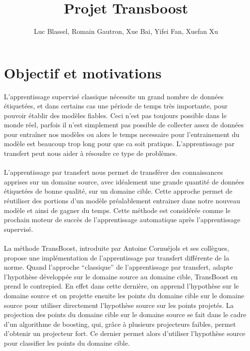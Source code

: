 \documentclass[11 pt]{article}
\title{Projet Transboost}
\author{Luc Blassel, Romain Gautron, Xue Bai, Yifei Fan, Xuefan Xu}
\begin{document}
\maketitle

\tableofcontents
\newpage

\section{Objectif et motivations}
\paragraph{}L’apprentissage supervisé  classique nécessite un grand nombre de données étiquetées, et dans certains cas une période de temps très importante, pour pouvoir établir des modèles fiables. Ceci n’est pas toujours possible dans le monde réel, parfois il n’est simplement pas possible de collecter assez de données pour entraîner nos modèles ou alors le temps necessaire pour l’entrainement du modèle est beaucoup trop long pour que ca soit pratique.  L’apprentissage par transfert peut nous aider à résoudre ce type de problèmes.

\paragraph{}L’apprentissage par transfert nous permet de transférer des connaissances apprises sur un domaine source, avec idéalement une grande quantité de données étiquetées de bonne qualité, sur un domaine cible. Cette approche permet de réutiliser des portions d’un modèle préalablement entrainer dans notre nouveau modèle et ainsi de gagner du temps. Cette méthode est considérée comme le prochain moteur de succès de l’apprentissage automatique après l’apprentissage supervisé.

\paragraph{}La méthode TransBoost, introduite par Antoine Cornuéjols et ses collègues, propose une implémentation de l’apprentissage par transfert différente de la norme.  Quand l’approche “classique” de l’apprentissage par transfert, adapte l'hypothèse développée sur le domaine source au domaine cible, TransBoost en prend le contrepied. En effet dans cette dernière, on apprend l'hypothèse sur le domaine source et on projette ensuite les points du domaine cible sur le domaine source pour utiliser directement l'hypothèse source sur les points projetés. La projection des points du domaine cible sur le domaine source se fait dans le cadre d'un algorithme de boosting, qui, grâce à plusieurs projecteurs faibles, permet d’obtenir un projecteur fort. Ce dernier permet alors d’utiliser l'hypothèse source pour classifier les points du domaine cible.
\end{document}
